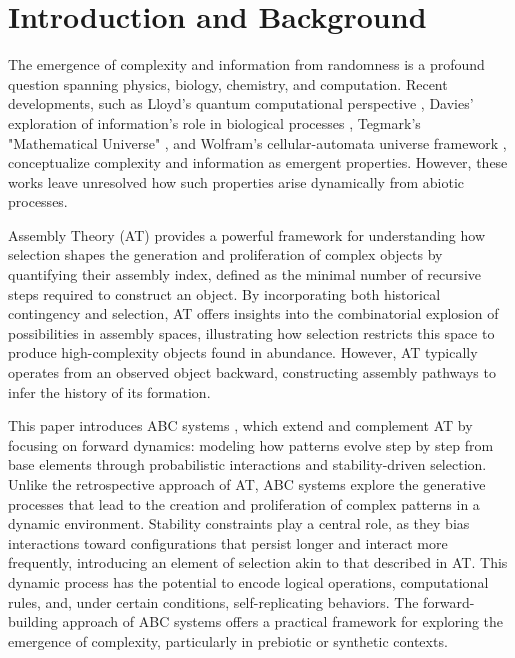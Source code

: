 \documentclass[entropy,article,submit,pdftex,oneauthor]{Definitions/mdpi}
\begin{document}
\section{Introduction and Background}

The emergence of complexity and information from randomness is a profound question spanning physics, biology, chemistry, and computation. Recent developments, such as Lloyd's quantum computational perspective \cite{lloyd2006programming}, Davies' exploration of information's role in biological processes \cite{davies2019demon}, Tegmark's "Mathematical Universe" \cite{tegmark2008mathematical}, and Wolfram's cellular-automata universe framework \cite{wolfram2020fundamental}, conceptualize complexity and information as emergent properties. However, these works leave unresolved how such properties arise dynamically from abiotic processes.

Assembly Theory (AT) \cite{walker2023nature} provides a powerful framework for understanding how selection shapes the generation and proliferation of complex objects by quantifying their assembly index, defined as the minimal number of recursive steps required to construct an object. By incorporating both historical contingency and selection, AT offers insights into the combinatorial explosion of possibilities in assembly spaces, illustrating how selection restricts this space to produce high-complexity objects found in abundance. However, AT typically operates from an observed object backward, constructing assembly pathways to infer the history of its formation.

This paper introduces ABC systems \cite{adler2024howinfoevolves}, which extend and complement AT by focusing on forward dynamics: modeling how patterns evolve step by step from base elements through probabilistic interactions and stability-driven selection. Unlike the retrospective approach of AT, ABC systems explore the generative processes that lead to the creation and proliferation of complex patterns in a dynamic environment. Stability constraints play a central role, as they bias interactions toward configurations that persist longer and interact more frequently, introducing an element of selection akin to that described in AT. This dynamic process has the potential to encode logical operations, computational rules, and, under certain conditions, self-replicating behaviors. The forward-building approach of ABC systems offers a practical framework for exploring the emergence of complexity, particularly in prebiotic or synthetic contexts.
\end{document}
